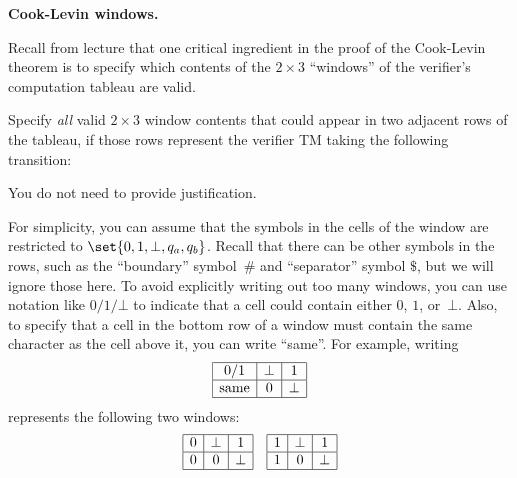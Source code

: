 \documentclass[11pt,addpoints]{exam}
\begin{document}
\begin{questions}
  \question[10] \textbf{Cook-Levin windows.}

  Recall from lecture that one critical ingredient in the proof of the Cook-Levin theorem is to specify which contents of the $2\times 3$ ``windows'' of the verifier's computation tableau are valid.

  Specify \emph{all} valid $2 \times 3$ window contents that could appear in two adjacent rows of the tableau, if those rows represent the verifier TM taking the following transition:
  \begin{center}
  \end{center}
  You do not need to provide justification.

  For simplicity, you can assume that the symbols in the cells of the window are restricted to $\set{0, 1, \bot,q_a,q_b}$.
  Recall that there can be other symbols in the rows, such as the ``boundary'' symbol~$\#$ and ``separator'' symbol $\$$, but we will ignore those here.
  To avoid explicitly writing out too many windows, you can use notation like $0/1/\bot$ to indicate that a cell could contain either $0$, $1$, or~$\bot$.
  Also, to specify that a cell in the bottom row of a window must contain the same character as the cell above it, you can write ``same''.
  For example, writing
  \[\begin{array}{|c|c|c|}
      \hline
      0/1 & \bot & 1 \\
      \hline
      \text{same} & 0 & \bot \\
      \hline
    \end{array}
  \]
  represents the following two windows:
  \[
  \begin{array}{|c|c|c|}
      \hline
      0 & \bot & 1 \\
      \hline
      0 & 0 & \bot \\
      \hline
    \end{array}
  \quad
  \begin{array}{|c|c|c|}
      \hline
      1 & \bot & 1 \\
      \hline
      1 & 0 & \bot \\
      \hline
  \end{array}
  \]
  

\end{questions}
\end{document}
